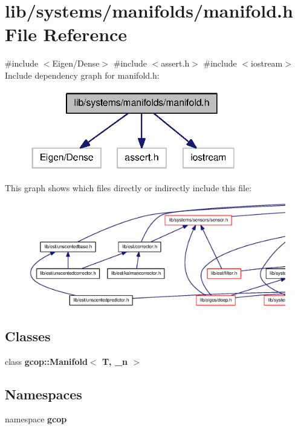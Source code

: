 \section{lib/systems/manifolds/manifold.h \-File \-Reference}
\label{manifold_8h}
{\ttfamily \#include $<$\-Eigen/\-Dense$>$}\*
{\ttfamily \#include $<$assert.\-h$>$}\*
{\ttfamily \#include $<$iostream$>$}\*
\-Include dependency graph for manifold.\-h\-:
\nopagebreak
\begin{figure}[H]
\begin{center}
\leavevmode
\includegraphics[width=258pt]{manifold_8h__incl}
\end{center}
\end{figure}
\-This graph shows which files directly or indirectly include this file\-:
\nopagebreak
\begin{figure}[H]
\begin{center}
\leavevmode
\includegraphics[width=350pt]{manifold_8h__dep__incl}
\end{center}
\end{figure}
\subsection*{\-Classes}
\begin{DoxyCompactItemize}
\item 
class {\bf gcop\-::\-Manifold$<$ T, \-\_\-n $>$}
\end{DoxyCompactItemize}
\subsection*{\-Namespaces}
\begin{DoxyCompactItemize}
\item 
namespace {\bf gcop}
\end{DoxyCompactItemize}
